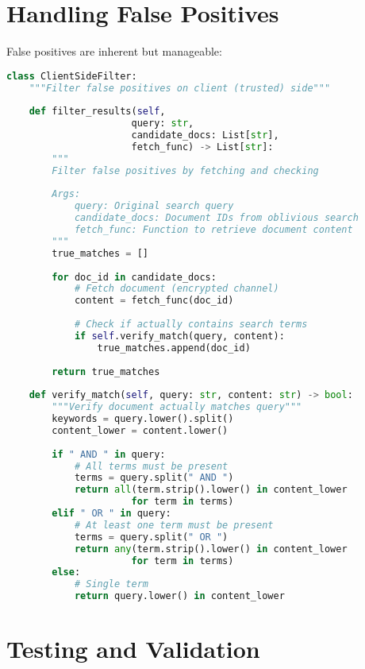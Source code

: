 \section{Handling False Positives}

False positives are inherent but manageable:

\begin{lstlisting}[language=Python, caption={Client-side false positive filtering}]
class ClientSideFilter:
    """Filter false positives on client (trusted) side"""
    
    def filter_results(self, 
                      query: str, 
                      candidate_docs: List[str], 
                      fetch_func) -> List[str]:
        """
        Filter false positives by fetching and checking
        
        Args:
            query: Original search query
            candidate_docs: Document IDs from oblivious search
            fetch_func: Function to retrieve document content
        """
        true_matches = []
        
        for doc_id in candidate_docs:
            # Fetch document (encrypted channel)
            content = fetch_func(doc_id)
            
            # Check if actually contains search terms
            if self.verify_match(query, content):
                true_matches.append(doc_id)
        
        return true_matches
    
    def verify_match(self, query: str, content: str) -> bool:
        """Verify document actually matches query"""
        keywords = query.lower().split()
        content_lower = content.lower()
        
        if " AND " in query:
            # All terms must be present
            terms = query.split(" AND ")
            return all(term.strip().lower() in content_lower 
                      for term in terms)
        elif " OR " in query:
            # At least one term must be present
            terms = query.split(" OR ")
            return any(term.strip().lower() in content_lower 
                      for term in terms)
        else:
            # Single term
            return query.lower() in content_lower
\end{lstlisting}

\section{Testing and Validation}

